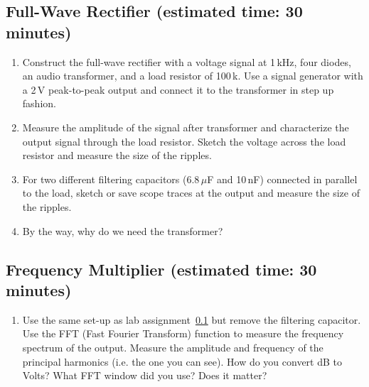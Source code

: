 \documentclass{article}
\begin{document}
\subsection{Full-Wave Rectifier (estimated time: 30 minutes)}
\label{lab:full-wave-rectifier}
\begin{enumerate}
\item Construct the full-wave rectifier with a voltage signal at 1\,kHz, four diodes, an audio transformer, and a load resistor of 100\,k\Ohm. Use a signal generator with a 2\,V peak-to-peak output and connect it to the transformer in step up fashion.
\item Measure the amplitude of the signal after transformer and characterize the output signal through the load resistor. Sketch the voltage across the load resistor and measure the size of the ripples.
\item For two different filtering capacitors ($6.8\,\mu$F and 10\,nF) connected in parallel to the load, sketch or save scope traces at the output and measure the size of the ripples.
\item By the way, why do we need the transformer?
\end{enumerate}

\subsection{Frequency Multiplier (estimated time: 30 minutes)}
\begin{enumerate}
\item Use the same set-up as lab assignment~\ref{lab:full-wave-rectifier} but remove the filtering capacitor.  Use the FFT (Fast Fourier Transform) function to measure the frequency spectrum of the output. Measure the amplitude and frequency of the principal harmonics (i.e. the one you can see). How do you convert dB to Volts? What FFT window did you use? Does it matter?
\end{enumerate}
\end{document}
